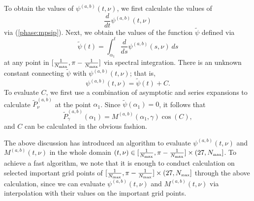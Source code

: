 \documentclass[11pt]{article}
\begin{document}
 

To obtain the
values of $\psi^{(a,b)}(t,\nu)$, we first calculate
the values of
\begin{equation}
\frac{d}{dt} \psi^{(a,b)}(t,\nu)
\end{equation}
via (\ref{phase:mpsip}).      Next, we obtain
the values of the function $\tilde{\psi}$  defined via
\begin{equation}
\tilde{\psi}(t) = \int_{\alpha_1}^t 
\frac{d}{ds} \psi^{(a,b)}(s,\nu)\ ds
\end{equation}
at any point in $[\frac{1}{N_{\mbox{\tiny max}}},\pi-\frac{1}{N_{\mbox{\tiny max}}}]$ via spectral integration.  There is
an unknown constant connecting $\tilde{\psi}$ with 
 $\psi^{(a,b)}(t,\nu)$; that is,
\begin{equation}
\psi^{(a,b)}(t,\nu) = \tilde{\psi}(t) + C.
\end{equation}
To evaluate $C$, we first use a combination of asymptotic and series
expansions to calculate $\tilde{P}_\nu^{(a,b)}$ at the point $\alpha_1$.
Since $\widetilde{\psi}(\alpha_1) =0$, it follows that 
\begin{equation}
\tilde{P}_\gamma^{(a,b)}(\alpha_1) = M^{(a,b)}(\alpha_1,\gamma) \cos( C),
\label{precomp:c}
\end{equation}
and $C$ can be calculated in the obvious fashion.  



The above discussion has introduced an algorithm to evaluate $\psi^{(a,b)}(t,\nu)$ and $M^{(a,b)}(t,\nu)$ in the whole domain $(t,\nu)\in [\frac{1}{N_{\mbox{\tiny max}}},\pi-\frac{1}{N_{\mbox{\tiny max}}}]\times (27,N_{\mbox{\tiny max}}]$. To achieve a fast algorithm, we note that it is enough to conduct calculation on selected important grid points of $[\frac{1}{N_{\mbox{\tiny max}}},\pi-\frac{1}{N_{\mbox{\tiny max}}}]\times (27,N_{\mbox{\tiny max}}]$ through the above calculation, since we can evaluate $\psi^{(a,b)}(t,\nu)$ and $M^{(a,b)}(t,\nu)$ via interpolation with their values on the important grid points.
\end{document}

